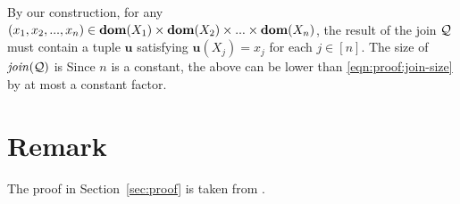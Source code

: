 \vgap

By our construction, for any $(x_1, x_2, ..., x_n) \in \mathbf{dom}(X_1) \times \mathbf{dom}(X_2) \times ... \times \mathbf{dom}(X_n)$, the result of the join $\mathcal{Q}$ must contain a tuple $\bm{u}$ satisfying $\bm{u}(X_j) = x_j$ for each $j \in [n]$. The size of $\mathit{join}(\mathcal{Q})$ is
Since $n$ is a constant, the above can be lower than \eqref{eqn:proof:join-size} by at most a constant factor.

\section{Remark}

The proof in Section~\ref{sec:proof} is taken from \cite{s23}.





